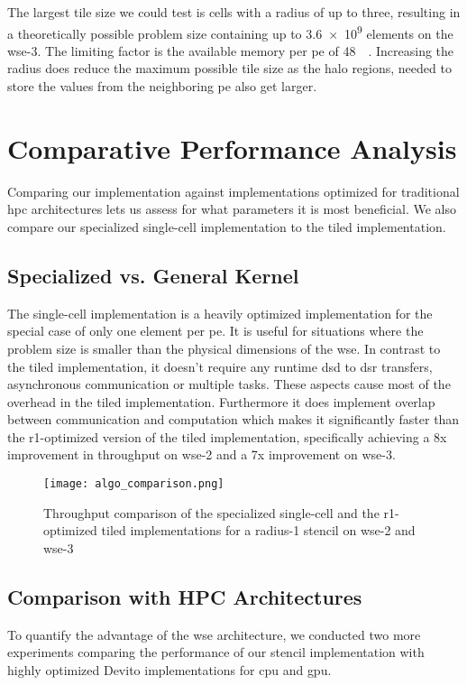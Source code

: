 The largest tile size we could test is  cells with a radius of up to three, resulting in a theoretically possible problem size containing up to \num{3.6e9} elements on the \ac{wse}-3. The limiting factor is the available memory per \ac{pe} of \qty{48}{\kilo\byte}. Increasing the radius does reduce the maximum possible tile size as the halo regions, needed to store the values from the neighboring \ac{pe} also get larger.



\section{Comparative Performance Analysis}
Comparing our implementation against implementations optimized for traditional \ac{hpc} architectures lets us assess for what parameters it is most beneficial. We also compare our specialized single-cell implementation to the tiled implementation.  

\subsection{Specialized vs. General Kernel}
The single-cell implementation is a heavily optimized implementation for the special case of only one element per \ac{pe}. It is useful for situations where the problem size is smaller than the physical dimensions of the \ac{wse}. In contrast to the tiled implementation, it doesn't require any runtime \ac{dsd} to \ac{dsr} transfers, asynchronous communication or multiple tasks. These aspects cause most of the overhead in the tiled implementation. Furthermore it does implement overlap between communication and computation which makes it significantly faster than the r1-optimized version of the tiled implementation, specifically achieving a 8x improvement in throughput on \ac{wse}-2 and a 7x improvement on \ac{wse}-3.
\begin{figure}[h]
    \centering
    \texttt{[image: algo\_comparison.png]}
    \caption{Throughput comparison of the specialized single-cell and the r1-optimized tiled implementations for a radius-1 stencil on \ac{wse}-2 and \ac{wse}-3}
    \label{fig:algo_comparison}
\end{figure}

\subsection{Comparison with HPC Architectures}
To quantify the advantage of the \ac{wse} architecture, we conducted two more experiments comparing the performance of our stencil implementation with highly optimized Devito implementations for \ac{cpu} and \ac{gpu}. 

